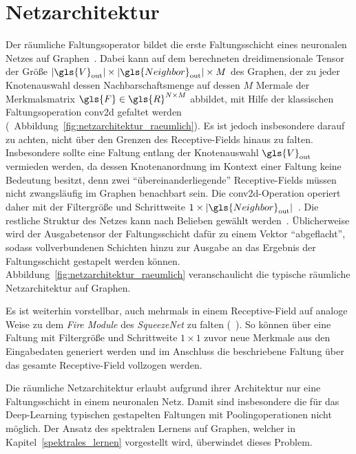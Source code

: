 \section{Netzarchitektur}
\label{raeumliche_netzarchitektur}

Der räumliche Faltungsoperator bildet die erste Faltungsschicht eines neuronalen Netzes auf Graphen~\cite{patchy}.
Dabei kann auf dem berechneten dreidimensionale Tensor der Größe $\left|\gls{V}_{\mathrm{out}}\right| \times \left|\gls{Neighbor}_{\mathrm{out}}\right| \times M$ des Graphen, der zu jeder Knotenauswahl dessen Nachbarschaftsmenge auf dessen $M$ Mermale der Merkmalsmatrix $\gls{F} \in \gls{R}^{N \times M}$ abbildet, mit Hilfe der klassischen Faltungsoperation \gls{conv2d} gefaltet werden (\vgl{}~Abbildung~\ref{fig:netzarchitektur_raeumlich}).
Es ist jedoch insbesondere darauf zu achten, nicht über den Grenzen des Receptive-Fields hinaus zu falten.
Insbesondere sollte eine Faltung entlang der Knotenauswahl $\gls{V}_{\mathrm{out}}$ vermieden werden, da dessen Knotenanordnung im Kontext einer Faltung keine Bedeutung besitzt, denn zwei \enquote{übereinanderliegende} Receptive-Fields müssen nicht zwangsläufig im Graphen benachbart sein.
Die \gls{conv2d}-Operation operiert daher mit der Filtergröße und Schrittweite $1 \times \left|\gls{Neighbor}_{\mathrm{out}}\right|$~\cite{patchy}.
Die restliche Struktur des Netzes kann nach Belieben gewählt werden~\cite{patchy}.
Üblicherweise wird der Ausgabetensor der Faltungsschicht dafür zu einem Vektor \enquote{abgeflacht}, sodass vollverbundenen Schichten hinzu zur Ausgabe an das Ergebnis der Faltungsschicht gestapelt werden können.
Abbildung~\ref{fig:netzarchitektur_raeumlich} veranschaulicht die typische räumliche Netzarchitektur auf Graphen.


Es ist weiterhin vorstellbar, auch mehrmals in einem Receptive-Field auf analoge Weise zu dem \emph{Fire Module} des \emph{SqueezeNet} zu falten (\vgl{}~\cite{squeeze}).
So können \zB{} über eine Faltung mit Filtergröße und Schrittweite $1 \times 1$ zuvor neue Merkmale aus den Eingabedaten generiert werden und im Anschluss die beschriebene Faltung über das gesamte Receptive-Field vollzogen werden.

Die räumliche Netzarchitektur erlaubt aufgrund ihrer Architektur nur eine Faltungsschicht in einem neuronalen Netz.
Damit sind insbesondere die für das Deep-Learning typischen gestapelten Faltungen mit Poolingoperationen nicht möglich.
Der Ansatz des spektralen Lernens auf Graphen, welcher in Kapitel~\ref{spektrales_lernen} vorgestellt wird, überwindet dieses Problem.
